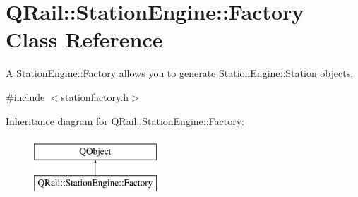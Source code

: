 \hypertarget{classQRail_1_1StationEngine_1_1Factory}{}\section{Q\+Rail\+::Station\+Engine\+::Factory Class Reference}
\label{classQRail_1_1StationEngine_1_1Factory}


A \mbox{\hyperlink{classQRail_1_1StationEngine_1_1Factory}{Station\+Engine\+::\+Factory}} allows you to generate \mbox{\hyperlink{classQRail_1_1StationEngine_1_1Station}{Station\+Engine\+::\+Station}} objects.  




{\ttfamily \#include $<$stationfactory.\+h$>$}

Inheritance diagram for Q\+Rail\+::Station\+Engine\+::Factory\+:\begin{figure}[H]
\begin{center}
\leavevmode
\includegraphics[height=2.000000cm]{classQRail_1_1StationEngine_1_1Factory}
\end{center}
\end{figure}
